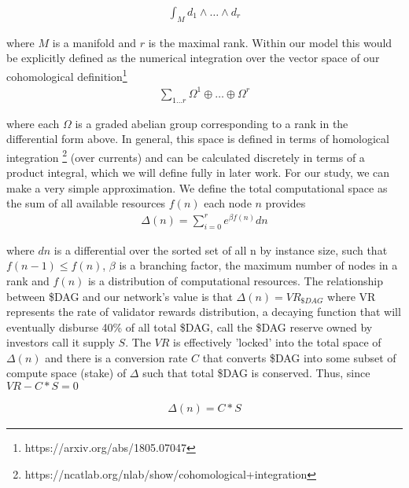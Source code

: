 \documentclass{article}
\begin{document}
\begin{equation*} \label{eq1}
\begin{split}
\int_M d_1\wedge \dots \wedge d_r
\end{split}
\end{equation*}

where $M$ is a manifold and $r$ is the maximal rank. Within our model this would be explicitly defined as the numerical integration over the vector space of our cohomological definition\footnote{https://arxiv.org/abs/1805.07047}
\begin{equation*} \label{eq1}
\begin{split}
\sum_{1 \dots r} \Omega^1 \oplus \dots \oplus \Omega^r
\end{split}
\end{equation*}

where each $\Omega$ is a graded abelian group corresponding to a rank in the differential form above. In general, this space is defined in terms of homological integration \footnote{https://ncatlab.org/nlab/show/cohomological+integration} (over currents) and can be calculated discretely in terms of a product integral, which we will define fully in later work. For our study, we can make a very simple approximation. We define the total computational space as the sum of all available resources $f(n)$ each node $n$ provides
\begin{equation*} \label{eq1}
\begin{split}
\Delta(n) = \sum_{i=0}^r e^{\beta f(n)} dn
\end{split}
\end{equation*}

where $dn$ is a differential over the sorted set of all n by instance size, such that $f(n-1) \leq f(n)$, $\beta$ is a branching factor, the maximum number of nodes in a rank and $f(n)$ is a distribution of computational resources. The relationship between \$DAG and our network's value is that $\Delta(n) = VR_{\$DAG}$ where VR represents the rate of validator rewards distribution, a decaying function that will eventually disburse 40\% of all total \$DAG, call the \$DAG reserve owned by investors call it supply $S$. The $VR$ is effectively 'locked' into the total space of $\Delta(n)$ and there is a conversion rate $C$ that converts \$DAG into some subset of compute space (stake) of $\Delta$ such that total \$DAG is conserved. Thus, since $VR - C*S = 0$ 

\begin{equation*} \label{eq1}
\begin{split}
\Delta(n) = C* S
\end{split}
\end{equation*}
\end{document}
